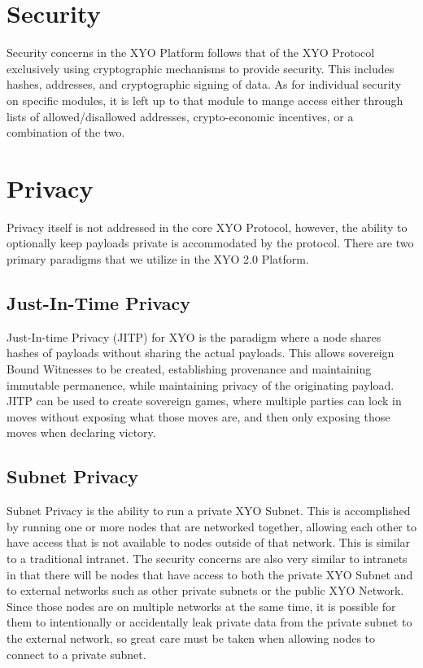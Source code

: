 \documentclass{article}
\begin{document}
\section {Security}
Security concerns in the XYO Platform follows that of the XYO Protocol exclusively using cryptographic mechanisms to provide security.  This includes hashes, addresses, and cryptographic signing of data.  As for individual security on specific modules, it is left up to that module to mange access either through lists of allowed/disallowed addresses, crypto-economic incentives, or a combination of the two.

\section {Privacy}
Privacy itself is not addressed in the core XYO Protocol, however, the ability to optionally keep payloads private is accommodated by the protocol.  There are two primary paradigms that we utilize in the XYO 2.0 Platform.

\subsection{Just-In-Time Privacy}
Just-In-time Privacy (JITP) for XYO is the paradigm where a node shares hashes of payloads without sharing the actual payloads. This allows sovereign Bound Witnesses to be created, establishing provenance and maintaining immutable permanence, while maintaining privacy of the originating payload.  JITP can be used to create sovereign games, where multiple parties can lock in moves without exposing what those moves are, and then only exposing those moves when declaring victory.

\subsection{Subnet Privacy}
Subnet Privacy is the ability to run a private XYO Subnet.  This is accomplished by running one or more nodes that are networked together, allowing each other to have access that is not available to nodes outside of that network.  This is similar to a traditional intranet.  The security concerns are also very similar to intranets in that there will be nodes that have access to both the private XYO Subnet and to external networks such as other private subnets or the public XYO Network.  Since those nodes are on multiple networks at the same time, it is possible for them to intentionally or accidentally leak private data from the private subnet to the external network, so great care must be taken when allowing nodes to connect to a private subnet.
\end{document}
